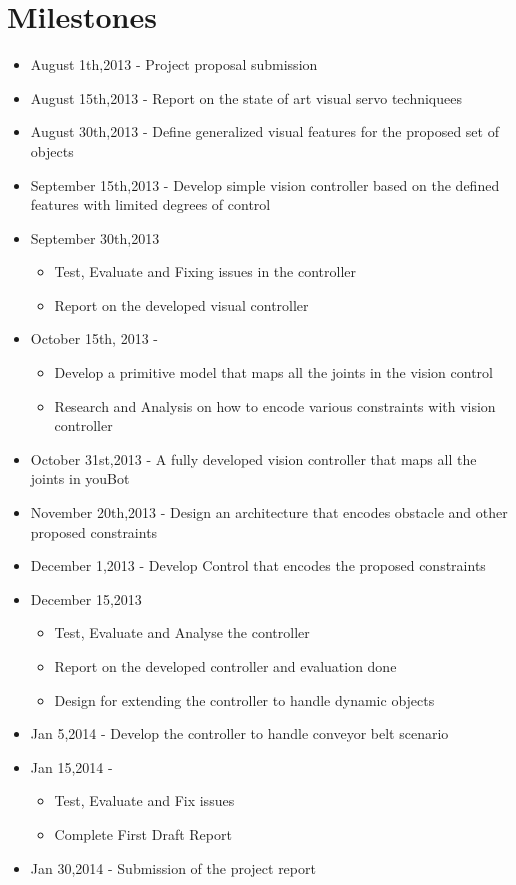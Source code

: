 \section{Milestones}
\begin{itemize}
\item August 1th,2013  -  Project proposal submission
\item August 15th,2013 -  Report on the state of art visual servo techniquees
\item August 30th,2013 -  Define generalized visual features for the proposed set of objects
\item September 15th,2013 -  Develop simple vision controller based on the defined features with limited degrees of control
\item September 30th,2013 
\begin{itemize}
\item Test, Evaluate and Fixing issues in the controller
\item Report on the developed visual controller
\end{itemize}
\item October 15th, 2013 - 
\begin{itemize}
\item Develop a primitive model that maps all the joints in the vision control
\item Research and Analysis on how to encode various constraints with vision controller
\end{itemize}
\item October 31st,2013 - A fully developed vision controller that maps all the joints in youBot
\item November 20th,2013 - Design an architecture that encodes obstacle and other proposed constraints
\item December 1,2013    - Develop Control that encodes the proposed constraints
\item December 15,2013   
\begin{itemize}
\item Test, Evaluate and Analyse the controller
\item Report on the developed controller and evaluation done
\item Design for extending the controller to handle dynamic objects
\end{itemize}
\item Jan 5,2014 - Develop the controller to handle conveyor belt scenario
\item Jan 15,2014 - 
\begin{itemize}
\item Test, Evaluate and Fix issues 
\item Complete First Draft Report
\end{itemize}
\item Jan 30,2014 - Submission of the project report
\end{itemize}